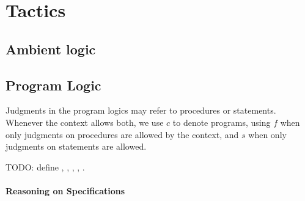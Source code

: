 \section{Tactics}

\subsection{Ambient logic}












































\subsection{Program Logic}

Judgments in the program logics may refer to procedures or
statements. Whenever the context allows both, we use $c$ to denote
programs, using $f$ when only judgments on procedures are allowed by
the context, and $s$ when only judgments on statements are allowed.

TODO: define , , , , .

\paragraph{Reasoning on Specifications}








%

